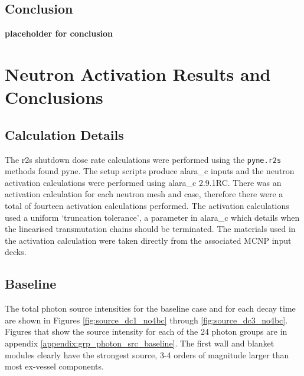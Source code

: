\documentclass[12pt]{article}
\begin{document}

\subsection{Conclusion}

\textbf{placeholder for conclusion}

\newpage
\clearpage

\section{Neutron Activation Results and Conclusions}
\subsection{Calculation Details}
The \gls{r2s} shutdown dose rate calculations were performed using the
\texttt{pyne.r2s} methods found \gls{pyne}. The setup scripts produce
\gls{alara_c} inputs and the neutron activation calculations were performed
using \gls{alara_c} 2.9.1RC. There was an activation calculation for each 
neutron mesh and case, therefore
there were a total of fourteen activation calculations performed. The activation
calculations used a uniform `truncation tolerance', a parameter in \gls{alara_c}
which details when the linearised transmutation chains should be terminated. The
materials used in the activation calculation were taken directly from the 
associated MCNP input decks. 

\subsection{Baseline}

The total photon source intensities for the baseline case and for each decay
time are shown in Figures \ref{fig:source_dc1_no4bc}
through \ref{fig:source_dc3_no4bc}.  Figures that show the source intensity
for each of the 24 photon groups are in
appendix \ref{appendix:grp_photon_src_baseline}.  The first wall and blanket modules
clearly have the strongest source, 3-4 orders of magnitude larger than most
ex-vessel components.
\end{document}
